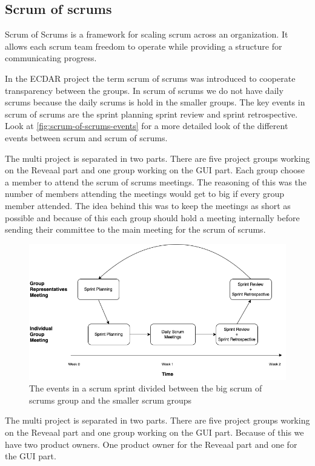 \subsection{Scrum of scrums}\label{sub:scrum-of-scrums}
Scrum of Scrums is a framework for scaling scrum across an organization. It allows each scrum team freedom to operate while providing a structure for communicating progress. 

In the ECDAR project the term scrum of scrums was introduced to cooperate transparency between the groups.
In scrum of scrums we do not have daily scrums because the daily scrums is hold in the smaller groups.
The key events in scrum of scrums are the sprint planning sprint review and sprint retrospective.
Look at \autoref{fig:scrum-of-scrums-events} for a more detailed look of the different events between scrum and scrum of scrums.

The multi project is separated in two parts. 
There are five project groups working on the Reveaal part and one group working on the GUI part.
Each group choose a member to attend the scrum of scrums meetings.
The reasoning of this was the number of members attending the meetings would get to big if every group member attended. 
The idea behind this was to keep the meetings as short as possible and because of this each group should hold a meeting internally before sending their committee to the main meeting for the scrum of scrums. 



\begin{figure}[H]
    \centering
    \includegraphics[width=\textwidth]{common/figures/Scrum_of_scrums_schedule.png}
    \caption{The events in a scrum sprint divided between the big scrum of scrums group and the smaller scrum groups}
    \label{fig:scrum-of-scrums-events}
\end{figure}


The multi project is separated in two parts. 
There are five project groups working on the Reveaal part and one group working on the GUI part.
Because of this we have two product owners.
One product owner for the Reveaal part and one for the GUI part.